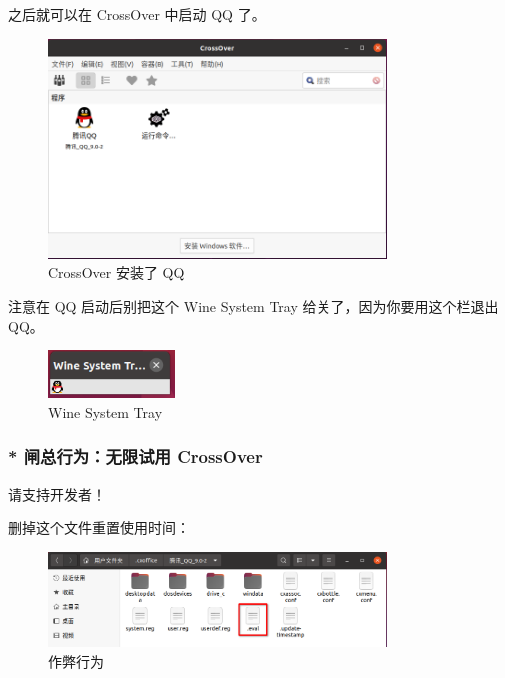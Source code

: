 \documentclass[UTF-8]{ctexart}
\begin{document}
				之后就可以在 CrossOver 中启动 QQ 了。
				
				\begin{figure}[H]
					\centering
					\includegraphics[width=0.8\textwidth]{fig/crossover_qq_installed.png}
					\caption*{CrossOver 安装了 QQ}
				\end{figure}
			
				注意在 QQ 启动后别把这个 Wine System Tray 给关了，因为你要用这个栏退出 QQ。
				
				\begin{figure}[H]
					\centering
					\includegraphics[width=0.3\textwidth]{fig/wine_system_tray.png}
					\caption*{Wine System Tray}
				\end{figure}
			
			\subsubsection{* 闸总行为：无限试用 CrossOver}
			
				\begin{center}
				{\huge 请支持开发者！}
				\end{center}	
				
				删掉这个文件重置使用时间：
				
				\begin{figure}[H]
					\centering
					\includegraphics[width=0.8\textwidth]{fig/crossover_cheat.png}
					\caption*{作弊行为}
				\end{figure}
			
\end{document}
